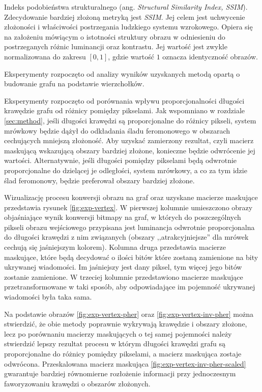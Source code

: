{    %
    Indeks podobieństwa strukturalnego (ang. \textit{Structural Similarity Index, SSIM}). Zdecydowanie bardziej złożoną
    metryką jest \textit{SSIM}. Jej celem jest uchwycenie złożoności i właściwości postrzegania ludzkiego systemu
    wzrokowego. Opiera się na założeniu mówiącym o istotności struktury obrazu w odniesieniu do postrzeganych różnic
    luminancji oraz kontrastu\cite{Wang2004ImageQA, Sara2019ImageQA}. Jej wartość jest zwykle normalizowana do zakresu
    $[0, 1]$, gdzie wartość $1$ oznacza identyczność obrazów.

    Eksperymenty rozpoczęto od analizy wyników uzyskanych metodą opartą o budowanie grafu na podstawie wierzchołków.

    Eksperymenty rozpoczęto od porównania wpływu proporcjonalności długości krawędzie grafu od różnicy pomiędzy
    pikselami. Jak wspomniano w rozdziale \ref{sec:method}, jeśli długości krawędzi są proporcjonalne do różnicy
    pikseli, system mrówkowy będzie dążył do odkładania śladu feromonowego w obszarach cechujących mniejszą złożoność.
    Aby uzyskać zamierzony rezultat, czyli macierz maskującą wskazującą obszary bardziej złożone, konieczne będzie
    odwrócenie jej wartości. Alternatywnie, jeśli długości pomiędzy pikselami będą odwrotnie proporcjonalne do dzielącej
    je odległości, system mrówkowy, a co za tym idzie ślad feromonowy, będzie preferował obszary bardziej złożone.

    Wizualizację procesu konwersji obrazu na graf oraz uzyskane macierze maskujące przedstawia rysunek
    \ref{fig:exp-vertex}. W pierwszej kolumnie umieszczono obrazy objaśniające wynik konwersji bitmapy na graf, w
    których do poszczególnych pikseli obrazu wejściowego przypisana jest luminancja odwrotnie proporcjonalna do długości
    krawędzi z nim związanych (obszary ,,atrakcyjniejsze'' dla mrówek cechują się jaśniejszym kolorem). Kolumna druga
    przedstawia macierze maskujące, które będą decydować o ilości bitów które zostaną zamienione na bity ukrywanej
    wiadomości. Im jaśniejszy jest dany piksel, tym więcej jego bitów zostanie zamienione. W trzeciej kolumnie
    przedstawiono macierze maskujące przetransformowane w taki sposób, aby odpowiadające im pojemność ukrywanej
    wiadomości była taka sama.

    Na podstawie obrazów \ref{fig:exp-vertex-pher} oraz \ref{fig:exp-vertex-inv-pher} można stwierdzić, że obie
    metody poprawnie wykrywają krawędzie i obszary złożone, lecz po porównaniu macierzy maskujących o tej samej
    pojemności należy stwierdzić lepszy rezultat procesu w którym długości krawędzi grafu są proporcjonalne do różnicy
    pomiędzy pikselami, a macierz maskująca zostaje odwrócona. Przeskalowana macierz maskująca
    \ref{fig:exp-vertex-inv-pher-scaled} gwarantuje bardziej równomierne rozłożenie informacji przy jednoczesnym
    faworyzowaniu krawędzi o obszarów złożonych.

}
